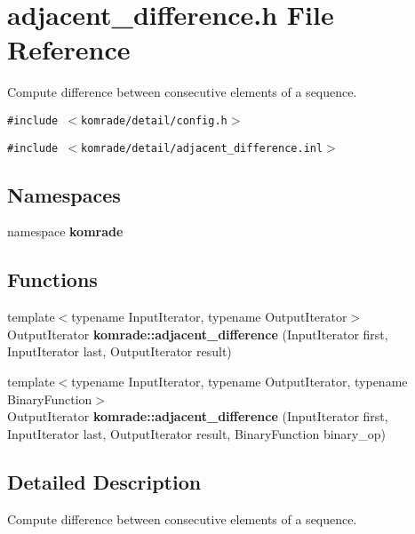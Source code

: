 \section{adjacent\_\-difference.h File Reference}
\label{adjacent__difference_8h}
Compute difference between consecutive elements of a sequence. 

{\tt \#include $<$komrade/detail/config.h$>$}\par
{\tt \#include $<$komrade/detail/adjacent\_\-difference.inl$>$}\par
\subsection*{Namespaces}
\begin{CompactItemize}
\item 
namespace {\bf komrade}
\end{CompactItemize}
\subsection*{Functions}
\begin{CompactItemize}
\item 
{\footnotesize template$<$typename InputIterator, typename OutputIterator$>$ }\\OutputIterator {\bf komrade::adjacent\_\-difference} (InputIterator first, InputIterator last, OutputIterator result)
\item 
{\footnotesize template$<$typename InputIterator, typename OutputIterator, typename BinaryFunction$>$ }\\OutputIterator {\bf komrade::adjacent\_\-difference} (InputIterator first, InputIterator last, OutputIterator result, BinaryFunction binary\_\-op)
\end{CompactItemize}


\subsection{Detailed Description}
Compute difference between consecutive elements of a sequence. 

